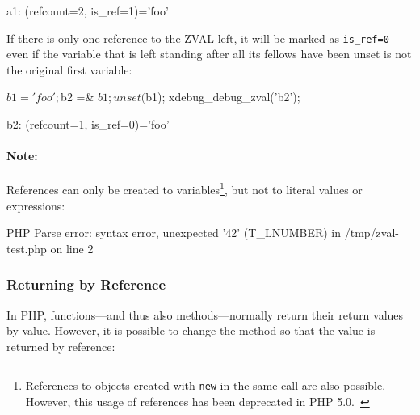 \begin{textcode}
a1: (refcount=2, is_ref=1)='foo'
\end{textcode}

If there is only one reference to the ZVAL left, it will be marked as \texttt{is\_ref=0}---even if the variable that is left standing after all its fellows have been unset is not the original first variable:

\begin{phpcode}
$b1 = 'foo';
$b2 =& $b1;
unset($b1);
xdebug_debug_zval('b2');
\end{phpcode}

\begin{textcode}
b2: (refcount=1, is_ref=0)='foo'
\end{textcode}

\paragraph{Note:} References can only be created to variables\footnote{References to objects created with \texttt{new} in the same call are also possible. However, this usage of references has been deprecated in PHP 5.0.~\cite{php-manual-what-references-do}}, but not to literal values or expressions:


\begin{textcode}
PHP Parse error:  syntax error, unexpected '42' (T_LNUMBER) in
  /tmp/zval-test.php on line 2
\end{textcode}


\subsubsection{Returning by Reference}

In PHP, functions---and thus also methods---normally return their return values by value. However, it is possible to change the method so that the value is returned by reference:~\cite{php-manual-returning-reference}


